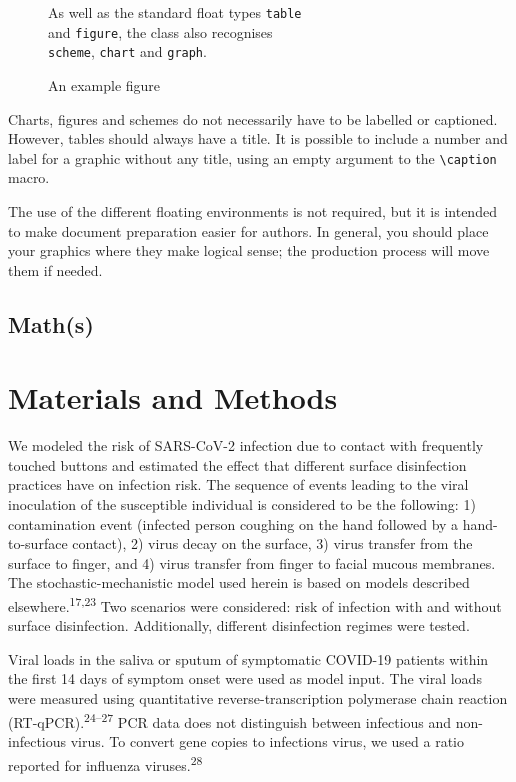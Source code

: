 \documentclass[journal=jacsat,manuscript=article]{achemso}
\begin{document}
\begin{figure}
  As well as the standard float types \texttt{table}\\
  and \texttt{figure}, the class also recognises\\
  \texttt{scheme}, \texttt{chart} and \texttt{graph}.
  \caption{An example figure}
  \label{fgr:example}
\end{figure}

Charts, figures and schemes do not necessarily have to be labelled or
captioned. However, tables should always have a title. It is possible to
include a number and label for a graphic without any title, using an
empty argument to the \texttt{\textbackslash caption} macro.

The use of the different floating environments is not required, but it
is intended to make document preparation easier for authors. In general,
you should place your graphics where they make logical sense; the
production process will move them if needed.

\hypertarget{maths}{%
\subsection{Math(s)}\label{maths}}

\hypertarget{materials-and-methods}{%
\section{Materials and Methods}\label{materials-and-methods}}

We modeled the risk of SARS-CoV-2 infection due to contact with
frequently touched buttons and estimated the effect that different
surface disinfection practices have on infection risk. The sequence of
events leading to the viral inoculation of the susceptible individual is
considered to be the following: 1) contamination event (infected person
coughing on the hand followed by a hand-to-surface contact), 2) virus
decay on the surface, 3) virus transfer from the surface to finger, and
4) virus transfer from finger to facial mucous membranes. The
stochastic-mechanistic model used herein is based on models described
elsewhere.\textsuperscript{17,23} Two scenarios were considered: risk of
infection with and without surface disinfection. Additionally, different
disinfection regimes were tested.

Viral loads in the saliva or sputum of symptomatic COVID-19 patients
within the first 14 days of symptom onset were used as model input. The
viral loads were measured using quantitative reverse-transcription
polymerase chain reaction (RT-qPCR).\textsuperscript{24--27} PCR data
does not distinguish between infectious and non-infectious virus. To
convert gene copies to infections virus, we used a ratio reported for
influenza viruses.\textsuperscript{28}
\end{document}
